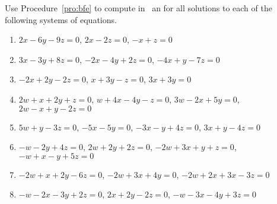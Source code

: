 \begin{exercise} \label{ex:} 
Use Procedure~\ref{pro:bfe} to compute in \script\ an  for all solutions to each of the following systems of equations.

\begin{enumerate}
\item \(2x-6y-9z=0\), \(2x-2z=0\), \(-x+z=0\)

\item \(3x-3y+8z=0\), \(-2x-4y+2z=0\), \(-4x+y-7z=0\)

\item \(-2x+2y-2z=0\), \(x+3y-z=0\), \(3x+3y=0\)

\item \(2w+x+2y+z=0\), \(w+4x-4y-z=0\), \(3w-2x+5y=0\), \(2w-x+y-2z=0\)

\item \(5w+y-3z=0\), \(-5x-5y=0\), \(-3x-y+4z=0\), \(3x+y-4z=0\)

\item \(-w-2y+4z=0\), \(2w+2y+2z=0\), \(-2w+3x+y+z=0\), \(-w+x-y+5z=0\)

\item \(-2w+x+2y-6z=0\), \(-2w+3x+4y=0\), \(-2w+2x+3x-3z=0\)

\item \(-w-2x-3y+2z=0\), \(2x+2y-2z=0\), \(-w-3x-4y+3z=0\)

\end{enumerate}
\end{exercise}






